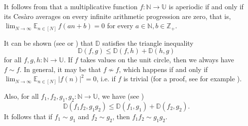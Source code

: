 \documentclass[11pt]{amsart}
\theoremstyle{definition}
\newcommand{\E}{{\mathbb E}}
\newcommand{\D}{{\mathbb D}}
\newcommand{\N}{{\mathbb N}}
\newcommand{\R}{{\mathbb R}}
\newcommand{\Z}{{\mathbb Z}}
\newcommand{\U}{{\mathbb U}}
\begin{document}
It follows from \cite[Corollary~1]{DD82}  that a  multiplicative function $f\colon \N\to \U$ is aperiodic if and only if
its Ces\`aro averages on every infinite arithmetic progression are zero, that is,
$\lim_{N\to\infty}\E_{n\in[N]}\, f(an+b)=0$ for every $a\in \N, b\in \Z_+$.

It can be shown (see \cite{GS08} or \cite[Section~4.1]{GS23}) that $\D$ satisfies the triangle inequality
$$
\D(f, g) \leq \D(f, h) + \D(h, g)
$$
for all  $f,g,h\colon \N\to \U$.
If  $f$ takes values on the unit circle, then we always have $f\sim f$. In general, it may be that $f\not\sim f$, which   happens if  and only if  $\lim_{N\to\infty}\E_{n\in[N]}\, |f(n)|^2=0$, i.e. if  $f$ is trivial (for a proof, see for example \cite[Lemma~2.9]{BPLR20}).

Also, for all  $f_1, f_2, g_1, g_2\colon \N\to \U$,  we have (see
\cite[Lemma~3.1]{GS07})
$$
 \D(f_1f_2, g_1g_2) \leq \D(f_1, g_1) + \D(f_2, g_2).
$$
It follows that if $f_1\sim g_1$ and $f_2\sim g_2$, then $f_1f_2\sim g_1g_2$.



\end{document}
